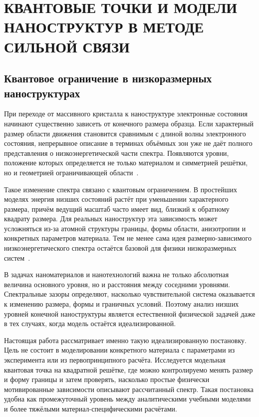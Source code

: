 \chapter{КВАНТОВЫЕ ТОЧКИ И МОДЕЛИ НАНОСТРУКТУР В МЕТОДЕ СИЛЬНОЙ СВЯЗИ}

\section{Квантовое ограничение в низкоразмерных наноструктурах}

При переходе от массивного кристалла к наноструктуре электронные состояния начинают
существенно зависеть от конечного размера образца. Если характерный размер области
движения становится сравнимым с длиной волны электронного состояния, непрерывное описание
в терминах объёмных зон уже не даёт полного представления о низкоэнергетической части
спектра. Появляются уровни, положение которых определяется не только материалом и
симметрией решётки, но и геометрией ограничивающей области~\cite{ashcroft1976solidstate,ki
ttel2005solidstate}.

Такое изменение спектра связано с квантовым ограничением. В простейших моделях энергия
низших состояний растёт при уменьшении характерного размера, причём ведущий масштаб часто
имеет вид, близкий к обратному квадрату размера. Для реальных наноструктур эта зависимость
может усложняться из-за атомной структуры границы, формы области, анизотропии и конкретных
параметров материала. Тем не менее сама идея размерно-зависимого низкоэнергетического
спектра остаётся базовой для физики низкоразмерных систем~\cite{reimann2002quantumdots,yof
fe2001quantumdots}.

В задачах наноматериалов и нанотехнологий важна не только абсолютная величина основного
уровня, но и расстояния между соседними уровнями. Спектральные зазоры определяют,
насколько чувствительной система оказывается к изменению размера, формы и граничных
условий. Поэтому анализ низших уровней конечной наноструктуры является естественной
физической задачей даже в тех случаях, когда модель остаётся идеализированной.

Настоящая работа рассматривает именно такую идеализированную постановку. Цель не состоит в
моделировании конкретного материала с параметрами из эксперимента или из первопринципного
расчёта. Исследуется модельная квантовая точка на квадратной решётке, где можно
контролируемо менять размер и форму границы и затем проверять, насколько простые физически
мотивированные зависимости описывают рассчитанный спектр. Такая постановка удобна как
промежуточный уровень между аналитическими учебными моделями и более тяжёлыми
материал-специфическими расчётами.

